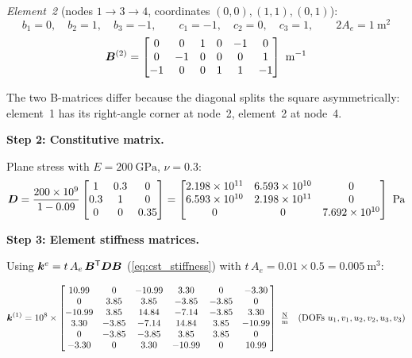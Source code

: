 \begin{example}
\noindent\textit{Element~2} (nodes $1\to3\to4$, coordinates $(0,0),(1,1),(0,1)$):
\[
    b_1 = 0,\quad b_2 = 1,\quad b_3 = -1,\qquad
    c_1 = -1,\quad c_2 = 0,\quad c_3 = 1,\qquad 2A_e = 1\ \text{m}^2
\]
\begin{equation}
    \bm{B}^{(2)} =
    \begin{bmatrix}
         0 &  0 &  1 &  0 & -1 &  0 \\
         0 & -1 &  0 &  0 &  0 &  1 \\
        -1 &  0 &  0 &  1 &  1 & -1
    \end{bmatrix}\ \text{m}^{-1}
    \label{eq:B2_cst_ex}
\end{equation}

The two B-matrices differ because the diagonal splits the square asymmetrically:
element~1 has its right-angle corner at node~2, element~2 at node~4.

\medskip
\noindent\textbf{Step 2: Constitutive matrix.}

Plane stress with $E = 200\ \text{GPa}$, $\nu = 0.3$:
\begin{equation}
    \bm{D} = \frac{200\times10^9}{1-0.09}
    \begin{bmatrix}1 & 0.3 & 0 \\ 0.3 & 1 & 0 \\ 0 & 0 & 0.35\end{bmatrix}
    =
    \begin{bmatrix}
        2.198\times10^{11} & 6.593\times10^{10} & 0 \\
        6.593\times10^{10} & 2.198\times10^{11} & 0 \\
        0 & 0 & 7.692\times10^{10}
    \end{bmatrix}\ \text{Pa}
    \label{eq:D_cst_ex}
\end{equation}

\medskip
\noindent\textbf{Step 3: Element stiffness matrices.}

Using $\bm{k}^e = t\,A_e\,\bm{B}^{\mathsf{T}}\bm{D}\bm{B}$ (\cref{eq:cst_stiffness})
with $t\,A_e = 0.01 \times 0.5 = 0.005\ \text{m}^3$:

\begin{equation}
    \bm{k}^{(1)} = 10^8 \times
    \begin{bmatrix}
        10.99 &  0     & -10.99 &  3.30  &  0     & -3.30  \\
         0    &  3.85  &   3.85 & -3.85  & -3.85  &  0     \\
       -10.99 &  3.85  &  14.84 & -7.14  & -3.85  &  3.30  \\
         3.30 & -3.85  &  -7.14 & 14.84  &  3.85  & -10.99 \\
         0    & -3.85  &  -3.85 &  3.85  &  3.85  &  0     \\
        -3.30 &  0     &   3.30 & -10.99 &  0     & 10.99
    \end{bmatrix}\ \tfrac{\text{N}}{\text{m}}
    \quad \text{(DOFs }u_1,v_1,u_2,v_2,u_3,v_3\text{)}
    \label{eq:ke1_cst}
\end{equation}


\end{example}
